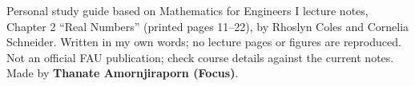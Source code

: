 \documentclass[11pt]{article}
\begin{document}
\vfill{\small Personal study guide based on Mathematics for Engineers I lecture notes, Chapter 2 “Real Numbers” (printed pages 11–22), by Rhoslyn Coles and Cornelia Schneider. Written in my own words; no lecture pages or figures are reproduced. Not an official FAU publication; check course details against the current notes. Made by \textbf{Thanate Amornjiraporn (Focus)}.}
\end{document}
